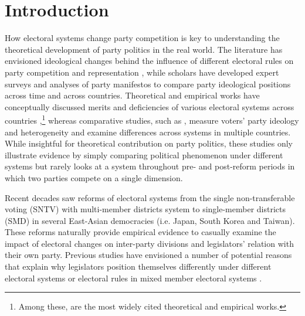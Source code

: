 \section*{\centering Introduction}
How electoral systems change party competition is key to understanding the theoretical development of party politics in the real world. The literature has envisioned ideological changes behind the influence of different electoral rules on party competition and representation \citep[e.g.][]{Curini2012, Dow2011, Ezrow2008}, while scholars have developed expert surveys \citep[][]{Bakker2014a, Benoit2006, Huber1995} and analyses of party manifestos \citep[][]{Budge2001, Budge1994, Huber1995, Volkens2013} to compare party ideological positions across time and across countries. Theoretical and empirical works have conceptually discussed merits and deficiencies of various electoral systems across countries \citep[e.g.][]{Andre2014, Cox2008, Shugart2003,  Burnham2005},\footnote{Among these, \citet{Cain1987, Grofman1999, Shugart2003, Ware2009, Colomer2011} are the most widely cited theoretical and empirical works.} whereas comparative studies, such as \citet{Carroll2019, Dow2011, Ezrow2008}, measure voters' party ideology and heterogeneity and examine differences across systems in multiple countries. While insightful for theoretical contribution on party politics, these studies only illustrate evidence by simply comparing political phenomenon under different systems but rarely looks at a system throughout pre- and post-reform periods in which two parties compete on a single dimension.

Recent decades saw reforms of electoral systems from the single non-transferable voting (SNTV) with multi-member districts system to single-member districts (SMD) in several East-Asian democracies (i.e. Japan, South Korea and Taiwan). These reforms naturally provide empirical evidence to casually examine the impact of electoral changes on inter-party divisions and legislators' relation with their own party. Previous studies have envisioned a number of potential reasons that explain why legislators position themselves differently under different electoral systems \citep{Catalinac2016} or electoral rules in mixed member electoral systems \citep[e.g. ][]{Batto2012, Hirano2011, Jun2010, Rich2014}. 


